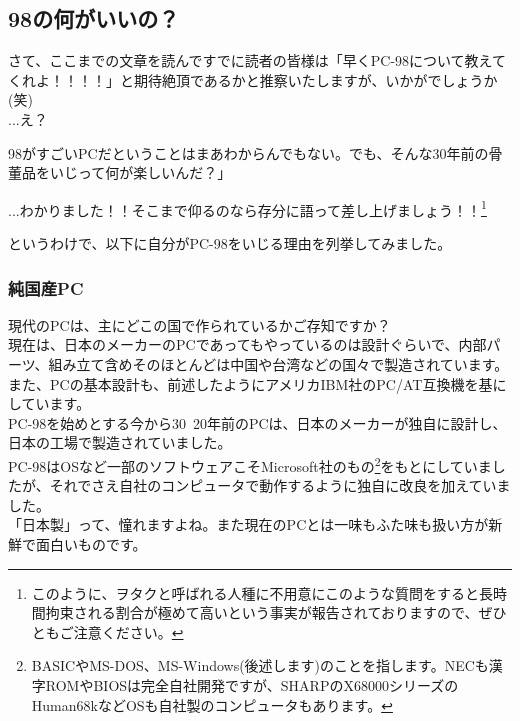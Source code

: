 \documentclass[b5paper,9pt,platex,dvipdfmx]{jsarticle}
\begin{document}
\begin{multicols*}{3}
\part{98の何がいいの？}
\setcounter{section}{0}
さて、ここまでの文章を読んですでに読者の皆様は「早くPC-98について教えてくれよ！！！！」と期待絶頂であるかと推察いたしますが、いかがでしょうか(笑)\\

...え？

\begin{screen}
98がすごいPCだということはまあわからんでもない。でも、そんな30年前の骨董品をいじって何が楽しいんだ？」
\end{screen}

...わかりました！！そこまで仰るのなら存分に語って差し上げましょう！！\footnote{このように、ヲタクと呼ばれる人種に不用意にこのような質問をすると長時間拘束される割合が極めて高いという事実が報告されておりますので、ぜひともご注意ください。}

というわけで、以下に自分がPC-98をいじる理由を列挙してみました。\\
\section[short]{純国産PC}
現代のPCは、主にどこの国で作られているかご存知ですか？\\
現在は、日本のメーカーのPCであってもやっているのは設計ぐらいで、内部パーツ、組み立て含めそのほとんどは中国や台湾などの国々で製造されています。\\
また、PCの基本設計も、前述したようにアメリカIBM社のPC/AT互換機を基にしています。\\
PC-98を始めとする今から30~20年前のPCは、日本のメーカーが独自に設計し、日本の工場で製造されていました。\\
PC-98はOSなど一部のソフトウェアこそMicrosoft社のもの\footnote{BASICやMS-DOS、MS-Windows(後述します)のことを指します。NECも漢字ROMやBIOSは完全自社開発ですが、SHARPのX68000シリーズのHuman68kなどOSも自社製のコンピュータもあります。}をもとにしていましたが、それでさえ自社のコンピュータで動作するように独自に改良を加えていました。\\
「日本製」って、憧れますよね。また現在のPCとは一味もふた味も扱い方が新鮮で面白いものです。\\

\end{multicols*}
\end{document}
